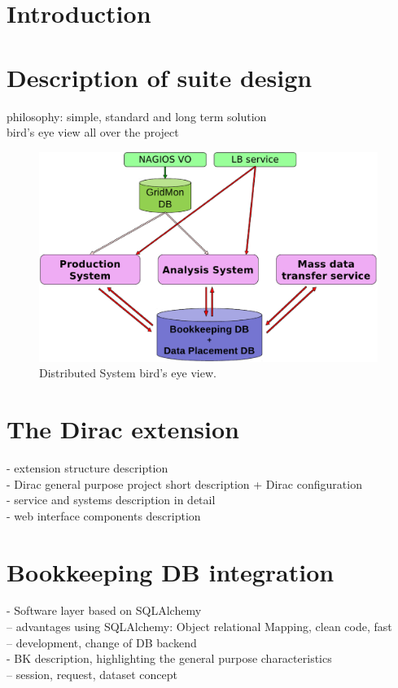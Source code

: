 \documentclass[a4paper]{jpconf}
\begin{document}
\section{Introduction}

\section{Description of suite design}
philosophy: simple, standard and long term solution\\
bird's eye view all over the project\\

\begin{figure}[h]
\includegraphics[width=26pc]{img/distributed_system_bird_eye.eps}\hspace{2pc}%
\caption{\label{fig:distributed_system_bird_eye_view}Distributed System bird's eye view.}
\end{figure}
 
\section{The Dirac extension} 
- extension structure description\\
- Dirac general purpose project short description + Dirac configuration\\
- service and systems description in detail\\
- web interface components description\\


\section{Bookkeeping DB integration}
- Software layer based on SQLAlchemy\\
-- advantages using SQLAlchemy: Object relational Mapping, clean code, fast\\
-- development, change of DB backend\\
- BK description, highlighting the general purpose characteristics\\
-- session, request, dataset concept\\
\end{document}

